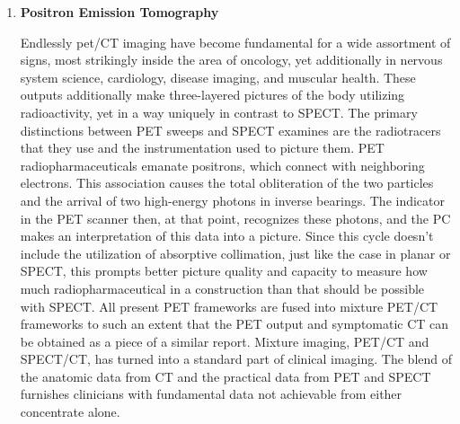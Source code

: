 \documentclass[12pt]{article}
\begin{document}
\begin{enumerate}
\item \textbf{Positron Emission Tomography} \par
Endlessly pet/CT imaging have become fundamental for a wide assortment of signs, most strikingly inside the area of oncology, yet additionally in nervous system science, cardiology, disease imaging, and muscular health. These outputs additionally make three-layered pictures of the body utilizing radioactivity, yet in a way uniquely in contrast to SPECT. The primary distinctions between PET sweeps and SPECT examines are the radiotracers that they use and the instrumentation used to picture them. PET radiopharmaceuticals emanate positrons, which connect with neighboring electrons. This association causes the total obliteration of the two particles and the arrival of two high-energy photons in inverse bearings. The indicator in the PET scanner then, at that point, recognizes these photons, and the PC makes an interpretation of this data into a picture. Since this cycle doesn't include the utilization of absorptive collimation, just like the case in planar or SPECT, this prompts better picture quality and capacity to measure how much radiopharmaceutical in a construction than that should be possible with SPECT.
All present PET frameworks are fused into mixture PET/CT frameworks to such an extent that the PET output and symptomatic CT can be obtained as a piece of a similar report. Mixture imaging, PET/CT and SPECT/CT, has turned into a standard part of clinical imaging. The blend of the anatomic data from CT and the practical data from PET and SPECT furnishes clinicians with fundamental data not achievable from either concentrate alone.
\end{enumerate}
\end{document}
